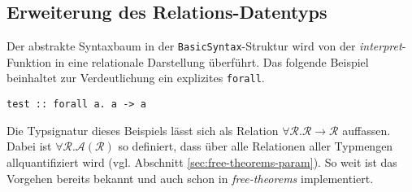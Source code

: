 %
%
%


\subsection{Erweiterung des Relations-Datentyps}

Der abstrakte Syntaxbaum in der \texttt{BasicSyntax}-Struktur wird von der \textit{interpret}-Funktion in eine relationale
Darstellung überführt. Das folgende Beispiel beinhaltet zur Verdeutlichung ein explizites \texttt{forall}.

\begin{verbatim}
test :: forall a. a -> a
\end{verbatim}

Die Typsignatur dieses Beispiels lässt sich als Relation $\forall \mathcal{R}. \mathcal{R} \rightarrow \mathcal{R}$ auffassen.
Dabei ist $\forall \mathcal{R}. \mathcal{A}(\mathcal{R})$ so definiert, dass über alle Relationen aller Typmengen allquantifiziert
wird (vgl. Abschnitt \ref{sec:free-theorems-param}). So weit ist das Vorgehen bereits bekannt und auch schon
in \textit{free-theorems} implementiert.

